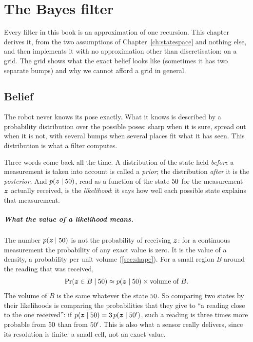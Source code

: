 \chapter{The Bayes filter}
\label{ch:bayes}

Every filter in this book is an approximation of one recursion. This
chapter derives it, from the two assumptions of
Chapter~\ref{ch:statespace} and nothing else, and then implements it with
no approximation other than discretisation: on a grid. The grid shows what
the exact belief looks like (sometimes it has two separate bumps) and why
we cannot afford a grid in general.

\section{Belief}

The robot never knows its pose exactly. What it knows is described by a
probability distribution over the possible poses: sharp when it is sure,
spread out when it is not, with several bumps when several places fit what
it has seen. This distribution is what a filter computes.

Three words come back all the time. A distribution of the state held
\emph{before} a measurement is taken into account is called a
\emph{prior}; the distribution \emph{after} it is the \emph{posterior}.
And $p(\bm{z}\mid50)$, read as a function of the state $50$ for the
measurement $\bm{z}$ actually received, is the \emph{likelihood}: it says how
well each possible state explains that measurement.

\paragraph{What the value of a likelihood means.} The number
$p(\bm{z}\mid50)$ is not the probability of receiving $\bm{z}$: for a continuous
measurement the probability of any exact value is zero. It is the value of
a density, a probability per unit volume (\cref{sec:shape}). For a small
region $B$ around the reading that was received,
\[
  \Pr(\bm{z}\in B\mid50)\approx p(\bm{z}\mid50)\times\text{volume of }B .
\]
The volume of $B$ is the same whatever the state $50$. So comparing two
states by their likelihoods is comparing the probabilities that they give
to ``a reading close to the one received'': if
$p(\bm{z}\mid50)=3\,p(\bm{z}\mid50')$, such a reading is three times more
probable from $50$ than from $50'$. This is also what a sensor really
delivers, since its resolution is finite: a small cell, not an exact
value.

